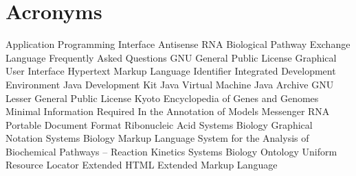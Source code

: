 \chapter{Acronyms}
\begin{acronym}
        {Application Programming Interface}
      {Antisense RNA}
     {Biological Pathway Exchange Language}
        {Frequently Asked Questions}
        {GNU General Public License}
        {Graphical User Interface}
       {Hypertext Markup Language}
         {Identifier}
        {Integrated Development Environment}
        {Java\texttrademark{} Development Kit}
        {Java\texttrademark{} Virtual Machine}
        {Java\texttrademark{} Archive}
       {GNU Lesser General Public License}
       {Kyoto Encyclopedia of Genes and Genomes}
     {Minimal Information Required In the Annotation of Models}
       {Messenger RNA}
        {Portable Document Format}
        {Ribonucleic Acid}
       {Systems Biology Graphical Notation}
       {Systems Biology Markup Language}
   {System for the Analysis of Biochemical Pathways -- Reaction Kinetics}
        {Systems Biology Ontology}
        {Uniform Resource Locator}
      {Extended \acs{HTML}}
        {Extended Markup Language}
\end{acronym}

